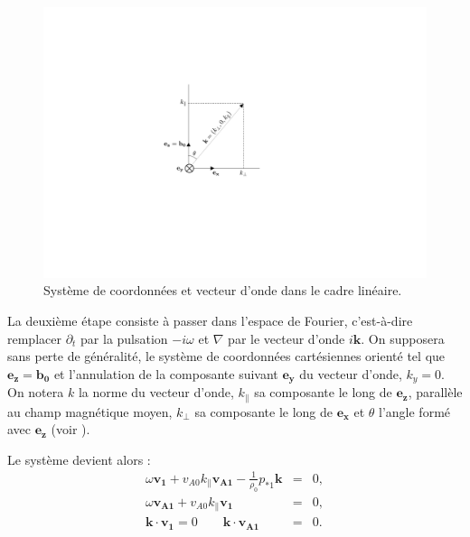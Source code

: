   \begin{figure}
  \centering
 \includegraphics[width=0.4\linewidth,trim=9.3cm 7.8cm 13cm 7cm, clip=true]{./Mainmatter/Part_0/images/schema_kplan.pdf}
 \caption{Système de coordonnées et vecteur d'onde dans le cadre linéaire.}
 \label{fig:schema_kplan}
\end{figure}

 La deuxième étape consiste à passer dans l'espace de Fourier, c'est-à-dire remplacer $\partial_t$ par la pulsation $-i\omega$ et $\nabla$ par le vecteur d'onde $i\boldsymbol{k}$. On supposera sans perte de généralité, le système de coordonnées cartésiennes orienté tel que $\boldsymbol{e_z} = \boldsymbol{b_0}$ et l'annulation de la composante suivant $\boldsymbol{e_y}$ du vecteur d'onde, $k_y = 0$. On notera $k$ la norme du vecteur d'onde, $k_{\parallel}$ sa composante le long de $\boldsymbol{e_z}$, parallèle au champ magnétique moyen, $k_{\perp}$ sa composante le long de $\boldsymbol{e_x}$ et $\theta$ l'angle formé avec $\boldsymbol{e_z}$ (voir ).

 Le système  devient alors : 
 \begin{eqnarray}
  \label{eq:lin_inc_v} \omega \boldsymbol{v_{1}}  + v_{A0} k_{\parallel} \boldsymbol{v_{A1}} - \frac{1}{\rho_0}  p_{*1} \boldsymbol{k}&=& 0 ,\\
  \label{eq:lin_inc_b} \omega \boldsymbol{v_{A1}}  +  v_{A0} k_{\parallel}  \boldsymbol{v_{1}}&=& 0 ,\\
  \label{eq:lin_inc_r} \boldsymbol{k} \cdot \boldsymbol{v_{1}} = 0 \qquad \boldsymbol{k} \cdot \boldsymbol{v_{A1}}  &=& 0 .
 \end{eqnarray}
 
